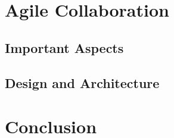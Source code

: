 \documentclass[sigplan,screen]{acmart}
\begin{document}
\section{Agile Collaboration}

\subsection{Important Aspects}

\subsection{Design and Architecture}

\section{Conclusion}





\end{document}
